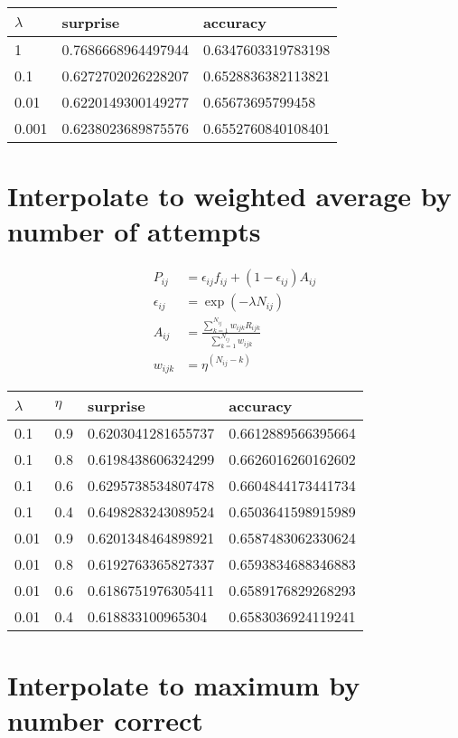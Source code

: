 \documentclass{article}
\begin{document}
\begin{center}
  \begin{tabular}{lll}
    $\lambda$ & surprise & accuracy \\
    \hline
    1 & 0.7686668964497944 & 0.6347603319783198 \\
    0.1 & 0.6272702026228207 & 0.6528836382113821 \\
    0.01 & 0.6220149300149277 & 0.65673695799458 \\
    0.001 & 0.6238023689875576 & 0.6552760840108401
  \end{tabular}
\end{center}

\newpage
\section{Interpolate to weighted average by number of attempts}

\begin{align*}
  P_{ij} &= \epsilon_{ij} f_{ij} + (1 - \epsilon_{ij}) A_{ij} \\
  \epsilon_{ij} &= \exp(-\lambda N_{ij}) \\
  A_{ij} &= \frac{\sum_{k = 1}^{N_{ij}} w_{ijk} R_{ijk}}{\sum_{k = 1}^{N_{ij}} w_{ijk}} \\
  w_{ijk} &= \eta^{(N_{ij} - k)}
\end{align*}

\begin{center}
  \begin{tabular}{llll}
    $\lambda$ & $\eta$ & surprise & accuracy \\
    \hline
    0.1 & 0.9 & 0.6203041281655737 & 0.6612889566395664 \\
    0.1 & 0.8 & 0.6198438606324299 & 0.6626016260162602 \\
    0.1 & 0.6 & 0.6295738534807478 & 0.6604844173441734 \\
    0.1 & 0.4 & 0.6498283243089524 & 0.6503641598915989 \\
    0.01 & 0.9 & 0.6201348464898921 & 0.6587483062330624 \\
    0.01 & 0.8 & 0.6192763365827337 & 0.6593834688346883 \\
    0.01 & 0.6 & 0.6186751976305411 & 0.6589176829268293 \\
    0.01 & 0.4 & 0.618833100965304 & 0.6583036924119241
  \end{tabular}
\end{center}

\newpage
\section{Interpolate to maximum by number correct}
\end{document}
